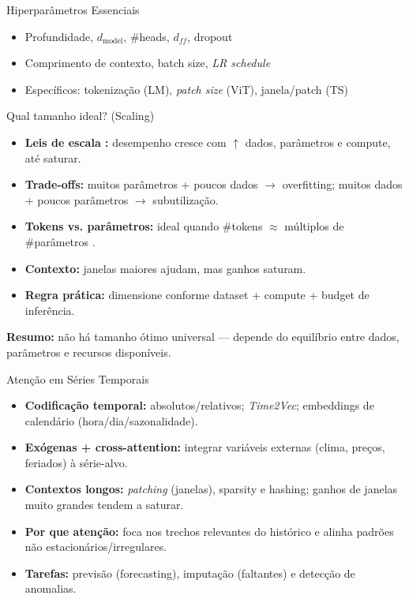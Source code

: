 \documentclass{beamer}
\begin{document}
\begin{frame}{Hiperparâmetros Essenciais}
	\begin{itemize}
		\item Profundidade, $d_{\text{model}}$, \#heads, $d_{ff}$, dropout
		\item Comprimento de contexto, batch size, \textit{LR schedule}
		\item Específicos: tokenização (LM), \textit{patch size} (ViT), janela/patch (TS)
	\end{itemize}
\end{frame}

\begin{frame}{Qual tamanho ideal? (Scaling)}
\begin{itemize}
  \item \textbf{Leis de escala \cite{kaplan2020scaling}:} 
        desempenho cresce com $\uparrow$ dados, parâmetros e compute, até saturar.
        
  \item \textbf{Trade-offs:} 
        muitos parâmetros + poucos dados $\to$ overfitting; 
        muitos dados + poucos parâmetros $\to$ subutilização.

  \item \textbf{Tokens vs. parâmetros:} 
        ideal quando \#tokens $\approx$ múltiplos de \#parâmetros 
        \cite{hoffmann2022training}.

  \item \textbf{Contexto:} 
        janelas maiores ajudam, mas ganhos saturam.

  \item \textbf{Regra prática:} 
        dimensione conforme dataset + compute + budget de inferência.
\end{itemize}

\vspace{0.2cm}
\textbf{Resumo:} não há tamanho ótimo universal — depende do equilíbrio entre
dados, parâmetros e recursos disponíveis.
\end{frame}





\begin{frame}{Atenção em Séries Temporais}
\begin{itemize}
  \item \textbf{Codificação temporal:} absolutos/relativos; \textit{Time2Vec}; embeddings de calendário (hora/dia/sazonalidade).
  \item \textbf{Exógenas + cross-attention:} integrar variáveis externas (clima, preços, feriados) à série-alvo.
  \item \textbf{Contextos longos:} \textit{patching} (janelas), sparsity e hashing; ganhos de janelas muito grandes tendem a saturar.
  \item \textbf{Por que atenção:} foca nos trechos relevantes do histórico e alinha padrões não estacionários/irregulares.
  \item \textbf{Tarefas:} previsão (forecasting), imputação (faltantes) e detecção de anomalias.
\end{itemize}
\end{frame}
\end{document}
